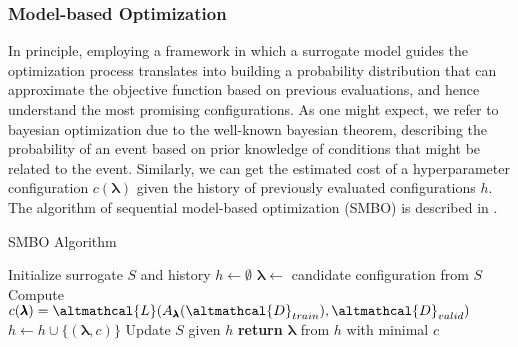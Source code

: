\subsubsection{Model-based Optimization}

In principle, employing a framework in which a surrogate model guides the optimization process translates into building a probability distribution that can approximate the objective function based on previous evaluations, and hence understand the most promising configurations.
As one might expect, we refer to bayesian optimization due to the well-known bayesian theorem, describing the probability of an event based on prior knowledge of conditions that might be related to the event.
Similarly, we can get the estimated cost of a hyperparameter configuration $c(\pmb{\lambda})$ given the history of previously evaluated configurations $h$.
The algorithm of sequential model-based optimization (SMBO) is described in .
\begin{algorithm}
    \caption{SMBO Algorithm}
    \label{alg:smbo}
    \begin{algorithmic}[1]
        \State Initialize surrogate $S$ and history $h \leftarrow \emptyset$
            \State $\pmb{\lambda} \leftarrow$ candidate configuration from $S$
            \State Compute $c(\pmb{\lambda}) = \altmathcal{L}(A_{\pmb{\lambda}}(\altmathcal{D}_{train}), \altmathcal{D}_{valid})$
            \State $h \leftarrow h \cup \{(\pmb{\lambda}, c)\}$
            \State Update $S$ given $h$
        \EndWhile
        \State \textbf{return} $\pmb{\lambda}$ from $h$ with minimal $c$
    \end{algorithmic}
\end{algorithm}


